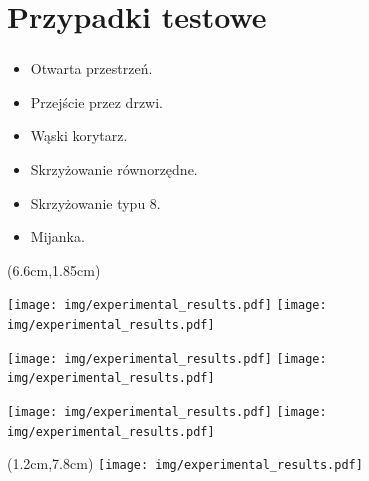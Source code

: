\documentclass{beamer}
\begin{document}
\section{Przypadki testowe}
\begin{frame}
\frametitle{\secname}

\begin{itemize}
	\item Otwarta przestrzeń.
	\item Przejście przez drzwi.	
	\item Wąski korytarz.
	\item Skrzyżowanie równorzędne.
	\item Skrzyżowanie typu 8.
	\item Mijanka.	
\end{itemize}

\begin{textblock*}{8cm}(6.6cm,1.85cm) %
	
	\texttt{[image: img/experimental\_results.pdf]}
	\texttt{[image: img/experimental\_results.pdf]}
	
	\texttt{[image: img/experimental\_results.pdf]}	
	\texttt{[image: img/experimental\_results.pdf]}
	
	\texttt{[image: img/experimental\_results.pdf]}
	\texttt{[image: img/experimental\_results.pdf]}
	
\end{textblock*}

\begin{textblock*}{5cm}(1.2cm,7.8cm) %
	\texttt{[image: img/experimental\_results.pdf]}	
\end{textblock*}


\end{frame}
\end{document}
